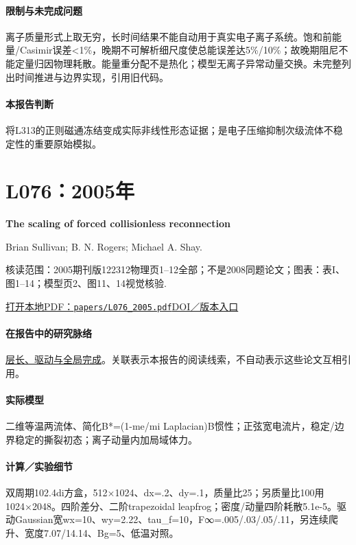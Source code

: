 \paragraph{限制与未完成问题}离子质量形式上取无穷，长时间结果不能自动用于真实电子离子系统。饱和前能量/Casimir误差<1\%，晚期不可解析细尺度使总能误差达5\%/10\%；故晚期阻尼不能定量归因物理耗散。能量重分配不是热化；模型无离子异常动量交换。未完整列出时间推进与边界实现，引用旧代码。

\paragraph{本报告判断}将L313的正则磁通冻结变成实际非线性形态证据；是电子压缩抑制次级流体不稳定性的重要原始模拟。

\section{L076：2005年}\label{paper:L076}

\textbf{The scaling of forced collisionless reconnection}\citep{L076}\

Brian Sullivan;  B. N. Rogers;  Michael A. Shay.

\textsf{核读范围：}2005期刊版122312物理页1–12全部；不是2008同题论文；\textsf{图表：}表I、图1–14；模型页2、图11、14视觉核验.

\href{run:papers/L076_2005.pdf}{打开本地PDF：\texttt{papers/L076\_2005.pdf}}\quad\href{https://doi.org/10.1063/1.2146910}{DOI／版本入口}

\paragraph{在报告中的研究脉络}\hyperref[story:global]{层长、驱动与全局完成}。关联表示本报告的阅读线索，不自动表示这些论文互相引用。

\paragraph{实际模型}二维等温两流体、简化B*=(1-me/mi Laplacian)B惯性；正弦宽电流片，稳定/边界稳定的撕裂初态；离子动量内加局域体力。

\paragraph{计算／实验细节}双周期102.4di方盒，512×1024、dx=.2、dy=.1，质量比25；另质量比100用1024×2048。四阶差分、二阶trapezoidal leapfrog；密度/动量四阶耗散5.1e-5。驱动Gaussian宽wx=10、wy=2.22、tau\_f=10，F∞=.005/.03/.05/.11，另连续爬升、宽度7.07/14.14、Bg=5、低温对照。

